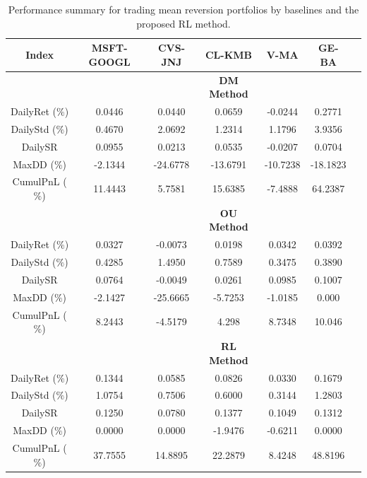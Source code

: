 \documentclass{article}
\begin{document}
\begin{table}
\centering
\begin{tabular}{c|cccccc}
\toprule
\textbf{Index} & \textbf{MSFT-GOOGL} & \textbf{CVS-JNJ} & \textbf{CL-KMB} & \textbf{V-MA} & \textbf{GE-BA}  \\ 
\midrule
&&&  \textbf{DM Method} \\
\midrule
DailyRet ($\%$) & 0.0446  & 0.0440   & 0.0659   &  -0.0244 & 0.2771\\ 
DailyStd ($\%$) & 0.4670  & 2.0692   & 1.2314   &  1.1796  & 3.9356\\ 
DailySR 	    & 0.0955  & 0.0213   & 0.0535   &  -0.0207 & 0.0704\\
MaxDD ($\%$)    & -2.1344 & -24.6778 & -13.6791 & -10.7238 & -18.1823\\ 
CumulPnL ($\%$) & 11.4443 & 5.7581   & 15.6385  &  -7.4888 & 64.2387\\  
\midrule
&&&  \textbf{OU Method}\\
\midrule
DailyRet ($\%$) & 0.0327 & -0.0073 & 0.0198 & 0.0342 & 0.0392\\ 
DailyStd ($\%$) & 0.4285 &  1.4950 & 0.7589 & 0.3475 & 0.3890 \\ 
DailySR 	   & 0.0764  & -0.0049 & 0.0261 & 0.0985 & 0.1007\\
MaxDD ($\%$)   &-2.1427  & -25.6665 & -5.7253 & -1.0185 & 0.000 \\ 
CumulPnL ($\%$)   & 8.2443 & -4.5179 & 4.298 & 8.7348   & 10.046\\  
\midrule
&&&  \textbf{RL Method}\\
\midrule
DailyRet ($\%$) & 0.1344  & 0.0585  &  0.0826 & 0.0330 & 0.1679 \\ 
DailyStd ($\%$) & 1.0754  & 0.7506  & 0.6000 & 0.3144 & 1.2803 \\ 
DailySR 	    & 0.1250  & 0.0780  & 0.1377 &  0.1049 & 0.1312 \\
MaxDD ($\%$)    & 0.0000  & 0.0000  & -1.9476 & -0.6211 &  0.0000 \\ 
CumulPnL ($\%$) & 37.7555 & 14.8895 & 22.2879 & 8.4248 & 48.8196 \\ 
\bottomrule
\end{tabular} 
\caption{Performance summary for trading mean reversion portfolios by baselines and the proposed RL method.}
\label{tab3} 
\end{table}
\end{document}
